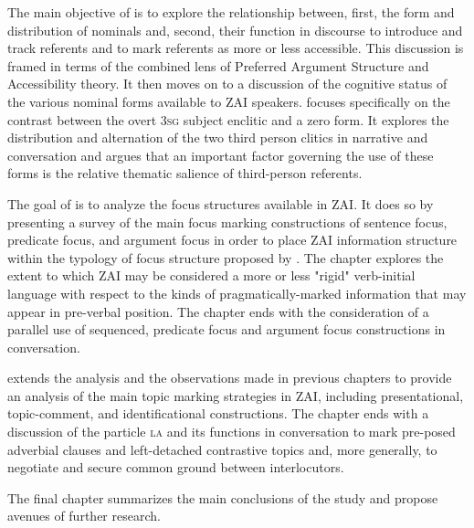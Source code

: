 The main objective of  is to explore the relationship between, first, the form and distribution of nominals and, second, their function in discourse to introduce and track referents and to mark referents as more or less accessible.  This discussion is framed in terms of the combined lens of Preferred Argument Structure and Accessibility theory. It then moves on to a discussion of the cognitive status of the various nominal forms available to ZAI speakers.  focuses specifically on the contrast between the overt \textsc{3sg} subject enclitic and a zero form. It explores the distribution and alternation of the two third person clitics in narrative and conversation and argues that an important factor governing the use of these forms is the relative thematic salience of third-person referents.  

The goal of  is to analyze the focus structures available in ZAI. It does so by presenting a survey of the main focus marking constructions of sentence focus, predicate focus, and argument focus \citep{lambrecht1994} in order to place ZAI information structure within the typology of focus structure proposed by \citet{vanvalin1999}. The chapter explores the extent to which ZAI may be considered a more or less "rigid" verb-initial language with respect to the kinds of pragmatically-marked information that may appear in pre-verbal position. The chapter ends with the consideration of a parallel use of sequenced, predicate focus and argument focus constructions in conversation. 

 extends the analysis and the observations made in previous chapters to provide an analysis of the main topic marking strategies in ZAI, including presentational, topic-comment, and identificational constructions. The chapter ends with a discussion of the particle \textsc{la} and its functions in conversation to mark pre-posed adverbial clauses and left-detached contrastive topics and, more generally, to negotiate and secure common ground between interlocutors. 


The final chapter summarizes the main conclusions of the study and propose avenues of further research.



